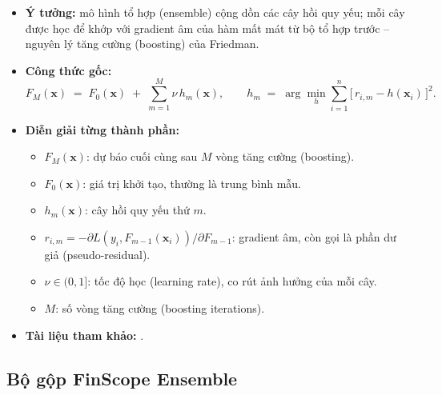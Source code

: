 \documentclass[12pt,a4paper,openany,oneside]{report}
\numberwithin{equation}{chapter}
\begin{document}
\begin{itemize}[leftmargin=18pt,topsep=2pt,itemsep=4pt]
  \item \textbf{Ý tưởng:} mô hình tổ hợp (ensemble) cộng dồn các cây hồi
        quy yếu; mỗi cây được học để khớp với gradient âm của hàm mất
        mát từ bộ tổ hợp trước -- nguyên lý tăng cường (boosting) của
        Friedman.
  \item \textbf{Công thức gốc:}
        \begin{equation}
          F_M(\mathbf{x}) \;=\; F_0(\mathbf{x}) \;+\;
          \sum_{m=1}^{M} \nu\, h_m(\mathbf{x}),
          \qquad
          h_m \;=\; \arg\min_{h}\sum_{i=1}^{n}
                    \bigl[\,r_{i,m} - h(\mathbf{x}_i)\,\bigr]^2.
          \label{eq:gbr}
        \end{equation}
  \item \textbf{Diễn giải từng thành phần:}
        \begin{itemize}[leftmargin=14pt,topsep=2pt,itemsep=1pt]
          \item $F_M(\mathbf{x})$: dự báo cuối cùng sau $M$ vòng tăng cường (boosting).
          \item $F_0(\mathbf{x})$: giá trị khởi tạo, thường là trung bình mẫu.
          \item $h_m(\mathbf{x})$: cây hồi quy yếu thứ $m$.
          \item $r_{i,m} = -\partial L(y_i,F_{m-1}(\mathbf{x}_i))/\partial F_{m-1}$:
                gradient âm, còn gọi là phần dư giả (pseudo-residual).
          \item $\nu \in (0,1]$: tốc độ học (learning rate), co rút
                ảnh hưởng của mỗi cây.
          \item $M$: số vòng tăng cường (boosting iterations).
        \end{itemize}
  \item \textbf{Tài liệu tham khảo:} \citet{Friedman2001}.
\end{itemize}

\subsection{Bộ gộp FinScope Ensemble}
\end{document}
